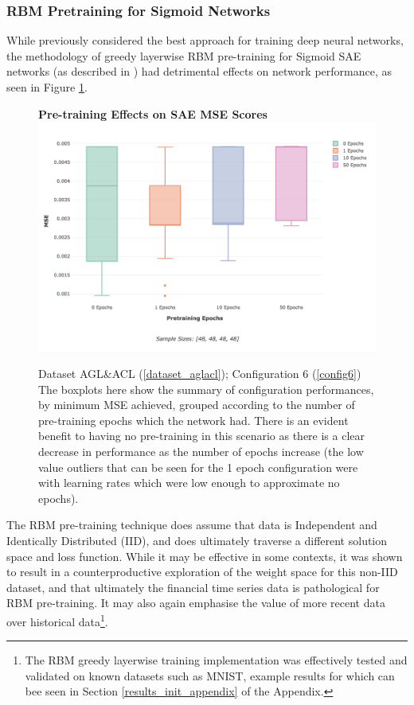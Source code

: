 \documentclass[a4paper,11pt,oneside]{article}
\theoremstyle{plain}
\theoremstyle{definition}
\begin{document}
	\subsubsection{RBM Pretraining for Sigmoid Networks}
	
	While previously considered the best approach for training deep neural networks, the methodology of greedy layerwise RBM pre-training for Sigmoid SAE networks (as described in \citep{Hinton2}) had detrimental effects on network performance, as seen in Figure \ref{figure-results-pretraining-effect}. \newline
	
	\begin{figure}[H]
		\centering
		\textbf{Pre-training Effects on SAE MSE Scores} 
		\includegraphics[scale=0.45]{images/results/newinit/actual_sigmoid_pt.png}
		\caption[Pre-training Effects on SAE MSE Scores]
		{Dataset AGL\&ACL (\ref{dataset_aglacl}); Configuration 6 (\ref{config6})
			\newline \newline The boxplots here show the summary of configuration performances, by minimum MSE achieved, grouped according to the number of pre-training epochs which the network had. There is an evident benefit to having no pre-training in this scenario as there is a clear decrease in performance as the number of epochs increase (the low value outliers that can be seen for the 1 epoch configuration were with learning rates which were low enough to approximate no epochs).}
		\label{figure-results-pretraining-effect}
	\end{figure}		
	
	The RBM pre-training technique does assume that data is Independent and Identically Distributed (IID), and does ultimately traverse a different solution space and loss function. While it may be effective in some contexts, it was shown to result in a counterproductive exploration of the weight space for this non-IID dataset, and that ultimately the financial time series data is pathological for RBM pre-training. It may also again emphasise the value of more recent data over historical data\footnote{The RBM greedy layerwise training implementation was effectively tested and validated on known datasets such as MNIST, example results for which can bee seen in Section \ref{results_init_appendix} of the Appendix.}.\newline 
	
\end{document}
